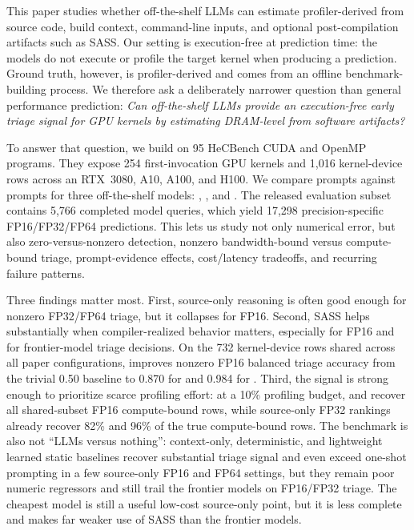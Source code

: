 This paper studies whether off-the-shelf LLMs can estimate profiler-derived \rai from source code, build context, command-line inputs, and optional post-compilation artifacts such as SASS.
Our setting is execution-free at prediction time: the models do not execute or profile the target kernel when producing a prediction.
Ground truth, however, is profiler-derived and comes from an offline benchmark-building process.
We therefore ask a deliberately narrower question than general performance prediction:
\textit{Can off-the-shelf LLMs provide an execution-free early triage signal for GPU kernels by estimating DRAM-level \rai from software artifacts?}

To answer that question, we build on 95 HeCBench CUDA and OpenMP programs.
They expose 254 first-invocation GPU kernels and 1{,}016 kernel-device rows across an RTX~3080, A10, A100, and H100.
We compare \sourceonly prompts against \sourcesass prompts for three off-the-shelf models: \gptfivefour, \opus, and \gptoss.
The released evaluation subset contains 5{,}766 completed model queries, which yield 17{,}298 precision-specific FP16/FP32/FP64 \rai predictions.
This lets us study not only numerical \rai error, but also zero-versus-nonzero detection, nonzero bandwidth-bound versus compute-bound triage, prompt-evidence effects, cost/latency tradeoffs, and recurring failure patterns.

Three findings matter most.
First, source-only reasoning is often good enough for nonzero FP32/FP64 triage, but it collapses for FP16.
Second, SASS helps substantially when compiler-realized behavior matters, especially for FP16 and for frontier-model triage decisions.
On the 732 kernel-device rows shared across all paper configurations, \sourcesass improves nonzero FP16 balanced triage accuracy from the trivial 0.50 baseline to 0.870 for \gptfivefour and 0.984 for \opus.
Third, the signal is strong enough to prioritize scarce profiling effort:
at a 10\% profiling budget, \sourcesass \gptfivefour and \opus recover all shared-subset FP16 compute-bound rows, while source-only FP32 rankings already recover 82\% and 96\% of the true compute-bound rows.
The benchmark is also not ``LLMs versus nothing'':
context-only, deterministic, and lightweight learned static baselines recover substantial triage signal and even exceed one-shot prompting in a few source-only FP16 and \sourcesass FP64 settings, but they remain poor numeric \rai regressors and still trail the frontier models on \sourcesass FP16/FP32 triage.
The cheapest model is still a useful low-cost source-only point, but it is less complete and makes far weaker use of SASS than the frontier models.

